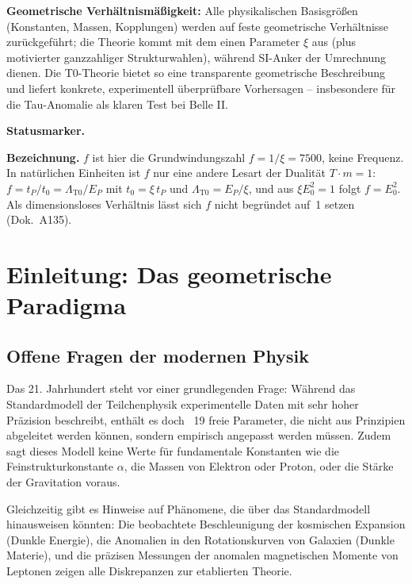 		\textbf{Geometrische Verhältnismäßigkeit:} Alle physikalischen Basisgrößen (Konstanten, Massen, Kopplungen) werden auf feste geometrische Verhältnisse zurückgeführt; die Theorie kommt mit dem einen Parameter $\xi$ aus (plus motivierter ganzzahliger Strukturwahlen), während SI-Anker der Umrechnung dienen. Die T0-Theorie bietet so eine transparente geometrische Beschreibung und liefert konkrete, experimentell überprüfbare Vorhersagen – insbesondere für die Tau-Anomalie als klaren Test bei Belle II.

	\medskip\noindent\textbf{Statusmarker.}
	

	\medskip\noindent\textbf{Bezeichnung.} $f$ ist hier die Grundwindungszahl $f = 1/\xi = 7500$, keine Frequenz. In natürlichen Einheiten ist $f$ nur eine andere Lesart der Dualität $T\cdot m = 1$: $f = t_P/t_0 = \Lambda_{\text{T0}}/E_P$ mit $t_0 = \xi\,t_P$ und $\Lambda_{\text{T0}} = E_P/\xi$, und aus $\xi E_0^2 = 1$ folgt $f = E_0^2$. Als dimensionsloses Verhältnis lässt sich $f$ nicht begründet auf~1 setzen (Dok.~A135).

	
	
	
	\section{Einleitung: Das geometrische Paradigma}
	
	\subsection{Offene Fragen der modernen Physik}
	
	Das 21. Jahrhundert steht vor einer grundlegenden Frage: Während das Standardmodell der Teilchenphysik experimentelle Daten mit sehr hoher Präzision beschreibt, enthält es doch ~19 freie Parameter, die nicht aus Prinzipien abgeleitet werden können, sondern empirisch angepasst werden müssen. Zudem sagt dieses Modell keine Werte für fundamentale Konstanten wie die Feinstrukturkonstante \(\alpha\), die Massen von Elektron oder Proton, oder die Stärke der Gravitation voraus.
	
	Gleichzeitig gibt es Hinweise auf Phänomene, die über das Standardmodell hinausweisen könnten: Die beobachtete Beschleunigung der kosmischen Expansion (Dunkle Energie), die Anomalien in den Rotationskurven von Galaxien (Dunkle Materie), und die präzisen Messungen der anomalen magnetischen Momente von Leptonen zeigen alle Diskrepanzen zur etablierten Theorie.
	
